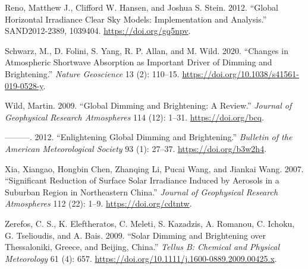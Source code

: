 \documentclass[
  preprint, 3p, authoryear]{article}
\newlength{\cslhangindent}
\newlength{\cslentryspacingunit} %
\newenvironment{CSLReferences}[2] %
 {%
  \setlength{\parindent}{0pt}
  \ifodd #1
  \let\oldpar\par
  \def\par{\hangindent=\cslhangindent\oldpar}
  \fi
  \setlength{\parskip}{#2\cslentryspacingunit}
 }%
 {}
\begin{document}
\begin{CSLReferences}{1}{0}
\leavevmode{}%
Reno, Matthew J., Clifford W. Hansen, and Joshua S. Stein. 2012. {``Global Horizontal Irradiance Clear Sky Models: Implementation and Analysis.''} SAND2012-2389, 1039404. \url{https://doi.org/gq5npv}.

\leavevmode{}%
Schwarz, M., D. Folini, S. Yang, R. P. Allan, and M. Wild. 2020. {``Changes in Atmospheric Shortwave Absorption as Important Driver of Dimming and Brightening.''} \emph{Nature Geoscience} 13 (2): 110--15. \url{https://doi.org/10.1038/s41561-019-0528-y}.

\leavevmode{}%
Wild, Martin. 2009. {``Global Dimming and Brightening: A Review.''} \emph{Journal of Geophysical Research Atmospheres} 114 (12): 1--31. \url{https://doi.org/bcq}.

\leavevmode{}%
---------. 2012. {``Enlightening Global Dimming and Brightening.''} \emph{Bulletin of the American Meteorological Society} 93 (1): 27--37. \url{https://doi.org/b3w2h4}.

\leavevmode{}%
Xia, Xiangao, Hongbin Chen, Zhanqing Li, Pucai Wang, and Jiankai Wang. 2007. {``Significant Reduction of Surface Solar Irradiance Induced by Aerosols in a Suburban Region in Northeastern China.''} \emph{Journal of Geophysical Research Atmospheres} 112 (22): 1--9. \url{https://doi.org/cdtntw}.

\leavevmode{}%
Zerefos, C. S., K. Eleftheratos, C. Meleti, S. Kazadzis, A. Romanou, C. Ichoku, G. Tselioudis, and A. Bais. 2009. {``Solar Dimming and Brightening over Thessaloniki, Greece, and Beijing, China.''} \emph{Tellus B: Chemical and Physical Meteorology} 61 (4): 657. \url{https://doi.org/10.1111/j.1600-0889.2009.00425.x}.

\end{CSLReferences}
\end{document}
